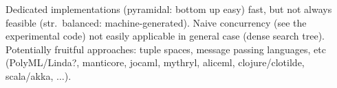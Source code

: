 \documentclass{scrartcl}
\DeclareMathOperator*{\argmin}{arg\,min}
\begin{document}
Dedicated implementations (pyramidal: bottom up easy) fast, but not always feasible (str.~balanced: machine-generated).
Naive concurrency (see the {\ttfamily experimental} code) not easily applicable in general case (dense search tree).
Potentially fruitful approaches: tuple spaces, message passing languages, etc
(PolyML/Linda?, manticore, jocaml, mythryl, aliceml, clojure/clotilde, scala/akka, $\ldots$).

%

\end{document}
